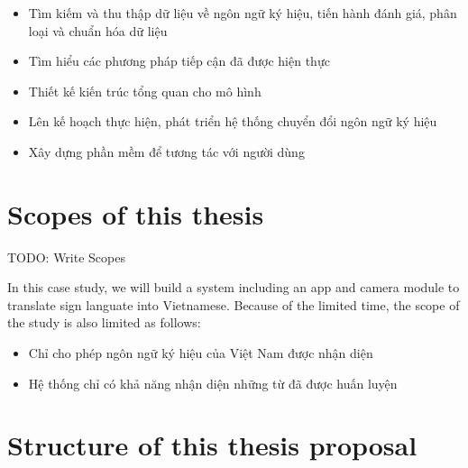 
\begin{itemize}
  \item Tìm kiếm và thu thập dữ liệu về ngôn ngữ ký hiệu, tiến hành đánh giá, phân loại và chuẩn hóa dữ liệu
	\item Tìm hiểu các phương pháp tiếp cận đã được hiện thực
  \item Thiết kế kiến trúc tổng quan cho mô hình
  \item Lên kế hoạch thực hiện, phát triển hệ thống chuyển đổi ngôn ngữ ký hiệu
  \item Xây dựng phần mềm để tương tác với người dùng
\end{itemize}


\section{Scopes of this thesis}

TODO: Write Scopes

  In this case study, we will build a system including an app and camera module to translate sign languate into Vietnamese.
  Because of the limited time, the scope of the study is also limited as follows:
  \begin{itemize}
    \item Chỉ cho phép ngôn ngữ ký hiệu của Việt Nam được nhận diện
    \item Hệ thống chỉ có khả năng nhận diện những từ đã được huấn luyện
  \end{itemize}

\section{Structure of this thesis proposal}

